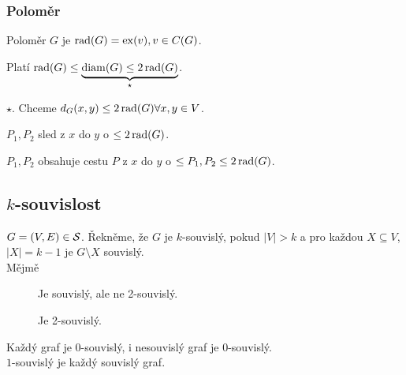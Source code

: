 \subsubsection{Poloměr}
Poloměr $G$ je $\rad(G) = \ex(v), v \in C(G)$.

Platí $\rad(G) \leq \underbrace{\diam(G) \leq 2 \rad(G)}_{\star}$.

 $\star$. Chceme $d_G(x,y) \leq 2 \rad(G) \forall x,y \in V$.
\begin{figure}[H]
\end{figure}
$P_1, P_2$ sled z $x$ do $y$ o $\leq 2 \rad(G)$.

$P_1, P_2$ obsahuje cestu $P$ z $x$ do $y$ o $\leq P_1, P_2 \leq 2\rad(G)$.

\subsection{\texorpdfstring{$k$}{k}-souvislost}
$G = (V,E) \in \S$. Řekněme, že $G$ je $k$-souvislý, pokud $|V| > k$ a pro každou $X \subseteq V$, $|X| = k-1$ je 
$G \setminus X$ souvislý.\\
Mějmě
\begin{figure}[H]
    \centering
    \begin{minipage}[c]{0.3\textwidth}
        \begin{figure}[H]
        \end{figure}
        Je souvislý, ale ne 2-souvislý.
    \end{minipage}%
    \hspace{0.1\textwidth}
    \begin{minipage}[c]{0.3\textwidth}
        \begin{figure}[H]
        \end{figure}
        Je 2-souvislý.
    \end{minipage}
\end{figure}
Každý graf je $0$-souvislý, i nesouvislý graf je $0$-souvislý.\\
$1$-souvislý je každý souvislý graf.

